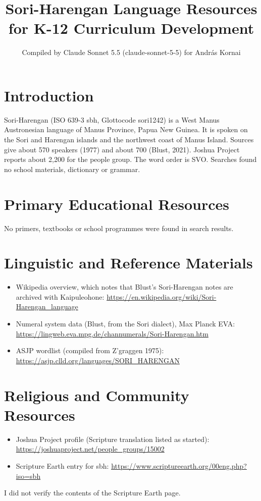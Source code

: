 \documentclass[12pt]{article}
\title{Sori-Harengan Language Resources for K-12 Curriculum Development}
\author{Compiled by Claude Sonnet 5.5 (claude-sonnet-5-5) for Andr\'as Kornai}
\date{}
\begin{document}
\maketitle

\section{Introduction}
Sori-Harengan (ISO 639-3 sbh, Glottocode sori1242) is a West Manus Austronesian language of Manus Province, Papua New Guinea. It is spoken on the Sori and Harengan islands and the northwest coast of Manus Island. Sources give about 570 speakers (1977) and about 700 (Blust, 2021). Joshua Project reports about 2,200 for the people group. The word order is SVO. Searches found no school materials, dictionary or grammar.

\section{Primary Educational Resources}
No primers, textbooks or school programmes were found in search results.

\section{Linguistic and Reference Materials}
\begin{itemize}
\item Wikipedia overview, which notes that Blust's Sori-Harengan notes are archived with Kaipuleohone: \url{https://en.wikipedia.org/wiki/Sori-Harengan_language}
\item Numeral system data (Blust, from the Sori dialect), Max Planck EVA: \url{https://lingweb.eva.mpg.de/channumerals/Sori-Harengan.htm}
\item ASJP wordlist (compiled from Z'graggen 1975): \url{https://asjp.clld.org/languages/SORI_HARENGAN}
\end{itemize}

\section{Religious and Community Resources}
\begin{itemize}
\item Joshua Project profile (Scripture translation listed as started): \url{https://joshuaproject.net/people_groups/15002}
\item Scripture Earth entry for sbh: \url{https://www.scriptureearth.org/00eng.php?iso=sbh}
\end{itemize}
I did not verify the contents of the Scripture Earth page.
\end{document}
